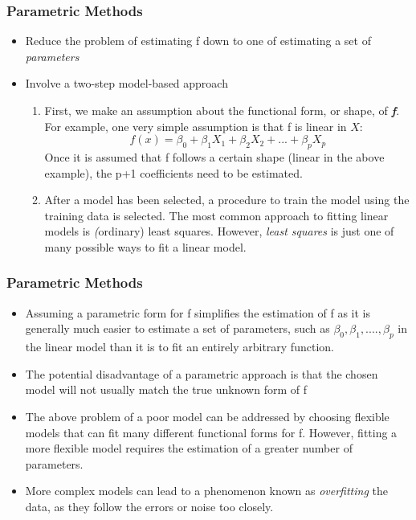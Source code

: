 \documentclass[12]{beamer}
\begin{document}
%
%

\begin{frame}
  \frametitle{Parametric Methods}
  \begin{itemize}
	\addtolength{\itemsep}{5pt}
	\item Reduce the problem of estimating f down to one of estimating a set of \textit{parameters}
	\item Involve a two-step model-based approach
	\begin{enumerate}
	  	\item First, we make an assumption about the functional form, or shape, of \textbf{\textit{f}}. For example, one very simple assumption is that f is linear in $X$:
	  	\begin{equation} \label{eq:1}
	  	  f(x) = \beta_{0} + \beta_{1}X_{1} + \beta_{2}X_{2} + ... + \beta_{p}X_{p}
	  	\end{equation}
	  	Once it is assumed that f follows a certain shape (linear in the above example), the p+1 coefficients need to be estimated.
	  	
	  	\item After a model has been selected, a procedure to train the model using the training data is selected. The most common
	  	approach to fitting linear models is \textit(ordinary) least squares. However, \textit{least squares} is just one of many possible
	  	ways to fit a linear model.
	\end{enumerate}
  \end{itemize}
\end{frame}

\begin{frame}
  \frametitle{Parametric Methods }
  \begin{itemize}
    \addtolength{\itemsep}{5pt}
    \item Assuming a parametric form for f simplifies the estimation of f as it is generally much easier to estimate a set of parameters,
    such as $\beta_{0}, \beta_{1}, ...., \beta_{p}$ in the linear model than it is to fit an entirely arbitrary function.
    \item The potential disadvantage of a parametric approach is that the chosen model will not usually match the true unknown form
    of f
    \item The above problem of a poor model can be addressed by choosing flexible models that can fit many different functional forms
    for f. However, fitting a more flexible model requires the estimation of a greater number of parameters.
    \item More complex models can lead to a phenomenon known as \textit{overfitting} the data, as they follow the errors or noise too
    closely.
  \end{itemize}
\end{frame}
\end{document}
